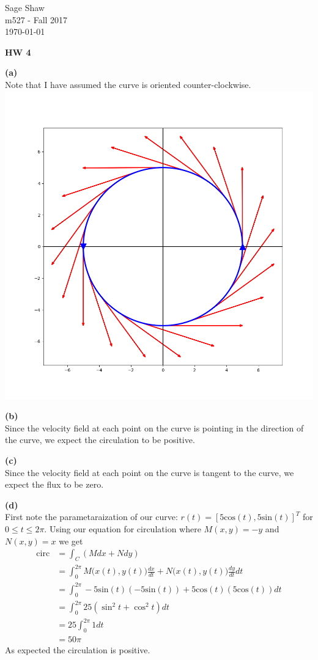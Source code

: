 \documentclass[12pt]{article}
\newcommand{\problem}[1]{\hspace{-4 ex} \large \textbf{#1}\\}
\begin{document}
	\thispagestyle{empty}
	
	\begin{flushright}
		Sage Shaw \\
		m527 - Fall 2017 \\
		\today
	\end{flushright}
	
{\large \textbf{HW 4}}\bigbreak

\problem{(a)}
	Note that I have assumed the curve is oriented counter-clockwise.\\
\includegraphics[width=1.0\textwidth]{hw5_figure_1}

\problem{(b)}
	Since the velocity field at each point on the curve is pointing in the direction of the curve, we expect the circulation to be positive.

\problem{(c)}
	Since the velocity field at each point on the curve is tangent to the curve, we expect the flux to be zero.
	
\problem{(d)}
	First note the parametaraization of our curve: $r(t) = [5\text{cos}(t), 5 \text{sin}(t)]^T$ for $0 \leq t \leq 2\pi$.
	Using our equation for circulation where $M(x,y) = -y$ and $N(x,y) = x$ we get
	\begin{align*}
		\text{circ} & = \int_{C}(Mdx + Ndy) \\
		& = \int_{0}^{2\pi} M\big(x(t),y(t)\big)\tfrac{dx}{dt} + N\big(x(t),y(t)\big) \tfrac{dy}{dt} dt \\
		& = \int_{0}^{2\pi} -5 \text{sin}(t)(-5\text{sin}(t)) + 5\text{cos}(t)(5\text{cos}(t)) dt \\
		& = \int_{0}^{2\pi} 25(\sin^2 t+\cos^2 t) dt \\
		& = 25\int_{0}^{2\pi} 1 dt \\
		& = 50\pi
	\end{align*}
	As expected the circulation is positive.\\
	
\end{document}
